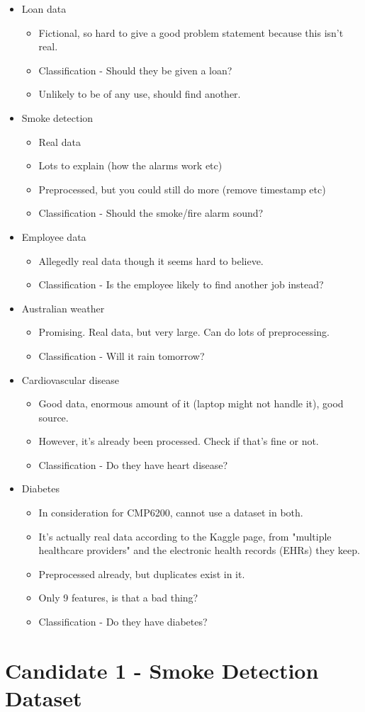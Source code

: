 \documentclass[12pt]{report}
\begin{document}
\begin{itemize}
    \item Loan data \begin{itemize}
        \item Fictional, so hard to give a good problem statement because this isn't real.
        \item Classification - Should they be given a loan?
        \item Unlikely to be of any use, should find another.
    \end{itemize}
    \item Smoke detection \begin{itemize}
        \item Real data
        \item Lots to explain (how the alarms work etc)
        \item Preprocessed, but you could still do more (remove timestamp etc)
        \item Classification - Should the smoke/fire alarm sound?
    \end{itemize}
    \item Employee data \begin{itemize}
        \item Allegedly real data though it seems hard to believe.
        \item Classification - Is the employee likely to find another job instead?
    \end{itemize}
    \item Australian weather \begin{itemize}
        \item Promising. Real data, but very large. Can do lots of preprocessing.
        \item Classification - Will it rain tomorrow?
    \end{itemize}
    \item Cardiovascular disease \begin{itemize}
        \item Good data, enormous amount of it (laptop might not handle it), good source. 
        \item However, it's already been processed. Check if that's fine or not.
        \item Classification - Do they have heart disease?
    \end{itemize}
    \item Diabetes \begin{itemize}
        \item In consideration for CMP6200, cannot use a dataset in both.
        \item It's actually real data according to the Kaggle page, from "multiple healthcare providers" and the 
        electronic health records (EHRs) they keep.
        \item Preprocessed already, but duplicates exist in it.
        \item Only 9 features, is that a bad thing?
        \item Classification - Do they have diabetes?
    \end{itemize}
\end{itemize}
\section{Candidate 1 - Smoke Detection Dataset}
\end{document}
